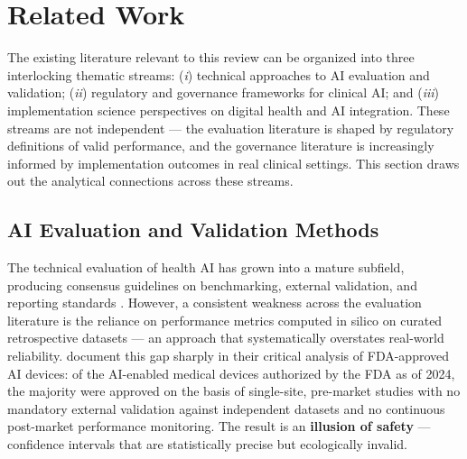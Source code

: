 
\section{Related Work}
\label{sec:related_work}

The existing literature relevant to this review can be organized into three
interlocking thematic streams: (\textit{i}) technical approaches to AI
evaluation and validation; (\textit{ii}) regulatory and governance frameworks
for clinical AI; and (\textit{iii}) implementation science perspectives on
digital health and AI integration. These streams are not independent — the
evaluation literature is shaped by regulatory definitions of valid performance,
and the governance literature is increasingly informed by implementation
outcomes in real clinical settings. This section draws out the analytical
connections across these streams.


\subsection{AI Evaluation and Validation Methods}
\label{sec:ai_evaluation}

The technical evaluation of health AI has grown into a mature subfield,
producing consensus guidelines on benchmarking, external validation, and
reporting standards \citep{pham2025ethical}. However, a consistent weakness
across the evaluation literature is the reliance on performance metrics
computed in silico on curated retrospective datasets — an approach that
systematically overstates real-world reliability. \citet{abulibdeh2025illusion}
document this gap sharply in their critical analysis of FDA-approved AI
devices: of the AI-enabled medical devices authorized by the FDA as of 2024,
the majority were approved on the basis of single-site, pre-market studies
with no mandatory external validation against independent datasets and no
continuous post-market performance monitoring. The result is an
\textbf{illusion of safety} — confidence intervals that are statistically
precise but ecologically invalid.

